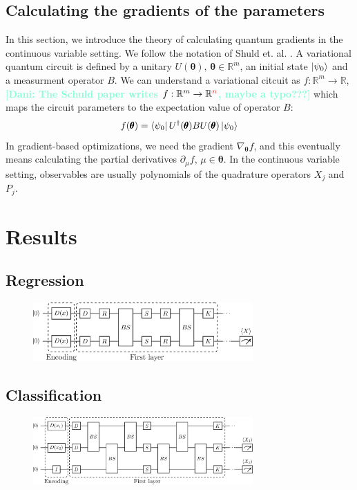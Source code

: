 \documentclass[12pt, a4paper,  nobibnotes]{article}
\newcommand{\red}[1]{\textcolor{red}{#1}}
\newcommand{\nd}[1]{\textcolor{Aquamarine}{\textbf{[Dani: #1]}}}
\begin{document}
\subsection{Calculating the gradients of the parameters}
\label{sec:qgrad}
In this section, we introduce the theory of calculating quantum gradients in the continuous variable setting. 
We follow the notation of Shuld et. al. \cite{AnalyticGradientsSchuld}. A variational quantum circuit is 
defined by a unitary $U(\pmb\theta),\, \pmb\theta\in\mathbb{R}^m$, an initial state $\ket{\psi_0}$ and a measurment 
operator $B$. We can understand a variational citcuit as $f:\mathbb{R}^m \rightarrow \mathbb{R}$, \nd{The Schuld paper writes $f:\mathbb{R}^m \rightarrow \mathbb{R}^{\red n}$, maybe a typo???} 
which maps the circuit parameters to the expectation value of operator $B$:
\begin{equation}
    f(\pmb\theta) = \bra{\psi_0}U^{\dagger}(\pmb\theta) B U(\pmb\theta)\ket{\psi_0}   
\end{equation}
In gradient-based optimizations, we need the gradient $\nabla_{\pmb\theta} f$, and this eventually means calculating the partial derivatives
$\partial_{\mu}f,\,\mu\in\pmb\theta$. In the continuous variable setting, observables are usually polynomials of the quadrature operators $X_j$ and $P_j$.



\section{Results}
\subsection{Regression}
\begin{figure}[H]
    \centering
    \includegraphics[width=0.75\textwidth]{figures/BasicTwoModeRegressor-circuit.pdf}
    \caption{}
    \label{fig:single_layer_regression}
\end{figure}

\subsection{Classification}
\begin{figure}[H]
    \centering
    \includegraphics[width=0.75\textwidth]{figures/Classifier-Circles-Ansatz.pdf}
    \caption{}
    \label{fig:single_layer_classification}
\end{figure}
\end{document}
